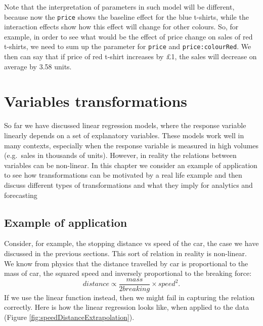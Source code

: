 \documentclass[
]{book}
\theoremstyle{definition}
\theoremstyle{definition}
\theoremstyle{definition}
\theoremstyle{definition}
\theoremstyle{remark}
\begin{document}
Note that the interpretation of parameters in such model will be different, because now the \texttt{price} shows the baseline effect for the blue t-shirts, while the interaction effects show how this effect will change for other colours. So, for example, in order to see what would be the effect of price change on sales of red t-shirts, we need to sum up the parameter for \texttt{price} and \texttt{price:colourRed}. We then can say that if price of red t-shirt increases by £1, the sales will decrease on average by 3.58 units.

\hypertarget{variablesTransformations}{%
\chapter{Variables transformations}\label{variablesTransformations}}

So far we have discussed linear regression models, where the response variable linearly depends on a set of explanatory variables. These models work well in many contexts, especially when the response variable is measured in high volumes (e.g.~sales in thousands of units). However, in reality the relations between variables can be non-linear. In this chapter we consider an example of application to see how transformations can be motivated by a real life example and then discuss different types of transformations and what they imply for analytics and forecasting

\hypertarget{example-of-application}{%
\section{Example of application}\label{example-of-application}}

Consider, for example, the stopping distance vs speed of the car, the case we have discussed in the previous sections. This sort of relation in reality is non-linear. We know from physics that the distance travelled by car is proportional to the mass of car, the squared speed and inversely proportional to the breaking force:
\begin{equation}
    distance \propto \frac{mass}{2 breaking} \times speed^2.
    \label{eq:speedDistanceFormula}
\end{equation}
If we use the linear function instead, then we might fail in capturing the relation correctly. Here is how the linear regression looks like, when applied to the data (Figure \ref{fig:speedDistanceExtrapolation}).
\end{document}
